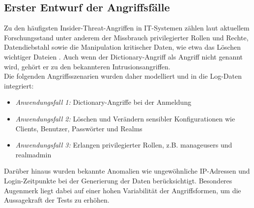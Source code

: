 \documentclass[a4paper,12pt]{article}
\begin{document}
	\subsection{Erster Entwurf der Angriffsfälle}
	Zu den häufigsten Insider-Threat-Angriffen in IT-Systemen zählen laut aktuellem Forschungsstand unter anderem der Missbrauch privilegierter Rollen und Rechte, Datendiebstahl sowie die Manipulation kritischer Daten, wie etwa das Löschen wichtiger Dateien \cite[S.6]{singh2022insiderthreats}. Auch wenn der Dictionary-Angriff als Angriff nicht genannt wird, gehört er zu den bekannteren Intrusionsangriffen.
	\\[0.5em]
	Die folgenden Angriffsszenarien wurden daher modelliert und in die Log-Daten integriert:
	
	\begin{itemize}
		\item \textit{Anwendungsfall 1:} Dictionary-Angriffe bei der Anmeldung
		\item \textit{Anwendungsfall 2:} Löschen und Verändern sensibler Konfigurationen wie Clients, Benutzer, Passwörter und Realms
		\item \textit{Anwendungsfall 3:} Erlangen privilegierter Rollen, z.B. \gls{manageusers} und \gls{realmadmin}
	\end{itemize}
	Darüber hinaus wurden bekannte Anomalien wie ungewöhnliche IP-Adressen und Login-Zeitpunkte bei der Generierung der Daten berücksichtigt. Besonderes Augenmerk liegt dabei auf einer hohen Variabilität der Angriffsformen, um die Aussagekraft der Tests zu erhöhen.
\end{document}
